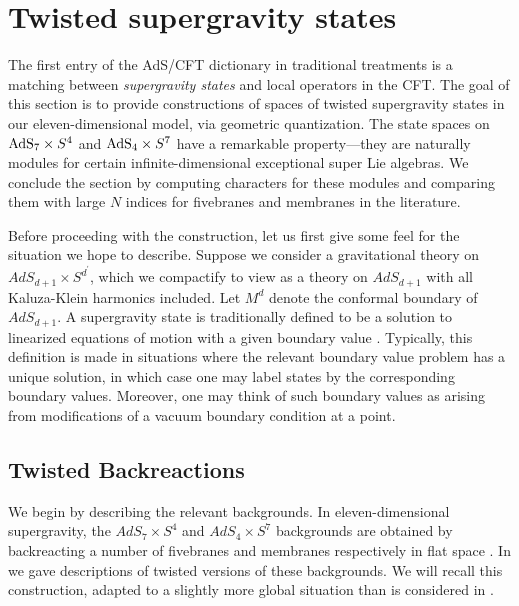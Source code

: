 %
%
%

\section{Twisted supergravity states}
\label{sec:states}

The first entry of the AdS/CFT dictionary in traditional treatments is a matching between \textit{supergravity states} and local operators in the CFT.
The goal of this section is to provide constructions of spaces of twisted supergravity states in our eleven-dimensional model, via geometric quantization. The state spaces on ${\rm AdS}_{7}\times S^{4}$ and ${\rm AdS}_{4}\times S^{7}$ have a remarkable property---they are naturally modules for certain infinite-dimensional exceptional super Lie algebras. We conclude the section by computing characters for these modules and comparing them with large $N$ indices for fivebranes and membranes in the literature.

Before proceeding with the construction, let us first give some feel for the situation we hope to describe. Suppose we consider a gravitational theory on $AdS_{d+1}\times S^{d^{\prime}}$, which we compactify to view as a theory on $AdS_{d+1}$ with all Kaluza-Klein harmonics included. Let $M^{d}$ denote the conformal boundary of $AdS_{d+1}$. A supergravity state is traditionally defined to be a solution to linearized equations of motion with a given boundary value \cite{}. Typically, this definition is made in situations where the relevant boundary value problem has a unique solution, in which case one may label states by the corresponding boundary values. Moreover, one may think of such boundary values as arising from modifications of a vacuum boundary condition at a point.


\subsection{Twisted Backreactions}
We begin by describing the relevant backgrounds. In eleven-dimensional supergravity, the $AdS_7 \times S^4$ and $AdS_{4}\times S^{7}$ backgrounds are obtained by backreacting a number of fivebranes and membranes respectively in flat space \cite{Maldacena:1997re,WittenAdS}.
In \cite{RSW} we gave descriptions of twisted versions of these backgrounds. We will recall this construction, adapted to a slightly more global situation than is considered in \cite{RSW}.

